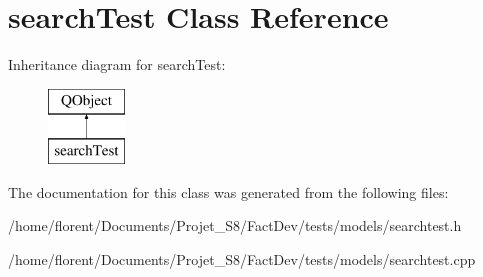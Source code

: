 \hypertarget{classsearchTest}{\section{search\-Test Class Reference}
\label{classsearchTest}
}
Inheritance diagram for search\-Test\-:\begin{figure}[H]
\begin{center}
\leavevmode
\includegraphics[height=2.000000cm]{d7/d51/classsearchTest}
\end{center}
\end{figure}


The documentation for this class was generated from the following files\-:\begin{DoxyCompactItemize}
\item 
/home/florent/\-Documents/\-Projet\-\_\-\-S8/\-Fact\-Dev/tests/models/searchtest.\-h\item 
/home/florent/\-Documents/\-Projet\-\_\-\-S8/\-Fact\-Dev/tests/models/searchtest.\-cpp\end{DoxyCompactItemize}
